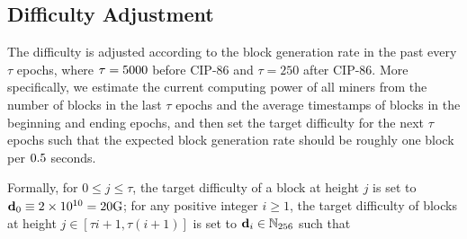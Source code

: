 \subsection{Difficulty Adjustment}
\label{sec:difficulty}

The difficulty is adjusted according to the block generation rate in the past every $\tau$ epochs, where $\tau=5000$ before CIP-86 and $\tau=250$ after CIP-86.
More specifically,
we estimate the current computing power of all miners from the number of blocks in the last $\tau$ epochs and the average timestamps of blocks in the beginning and ending epochs,
and then set the target difficulty for the next $\tau$ epochs such that the expected block generation rate should be roughly one block per $0.5$ seconds.

Formally,
for $0\le j\le \tau$,
the target difficulty of a block at height $j$ is set to $\mathbf{d}_0\equiv {2\times 10^{10}=20 \mathrm{G}}$;
for any positive integer $i\ge 1$,
the target difficulty of blocks at height $j\in [\tau i+1,\tau (i+1)]$ is set to $\mathbf{d}_i \in\mathbb{N}_{256}$ such that


